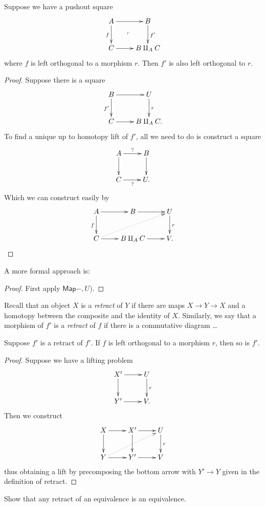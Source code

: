 \begin{lemma}
\label{lemma-orthogonal-lemma2}
Suppose we have a pushout square
$$
\xymatrix{
A\ar[r]\ar[d]_f\ar@{}[dr]|-{\ulcorner}&B\ar[d]^{f'}\\
C\ar[r]&B \amalg_A C
}
$$
where $f$ is left orthogonal to a morphism $r$.
Then $f'$ is also left orthogonal to $r$.
\end{lemma}

\begin{proof}
Suppose there is a square
$$
\xymatrix{
B\ar[r]\ar[d]_{f'}&U\ar[d]^{r}\\
C\ar[r]&B \amalg_A C.
}
$$
To find a unique up to homotopy lift of $f'$, 
all we need to do is construct a square
$$
\xymatrix{
A\ar[r]^?\ar[d]&B\ar[d]\\
C\ar[r]_?&U.
}
$$
Which we can construct easily by
$$
\xymatrix{
A \ar[d]_f\ar[r]& B\ar[r]& U\ar[d]^r\\
C\ar@{.>}[urr]\ar[r]&  B \amalg_A C \ar[r]&V.
}
$$
\end{proof}

A more formal approach is:

\begin{proof}
First apply $\mathsf{Map}-,U)$.
\end{proof}

\begin{definition}
\label{definition-retract}
Recall that an object $X$ is a {\it retract} of $Y$ 
if there are maps $X \to Y \to X$ and 
a homotopy between the composite and the identity of $X$.
Similarly,
we say that a morphism of $f'$ is
a {\it retract} of $f$ if there is a commutative diagram
…
\end{definition}

\begin{lemma}
\label{lemma-retract-orthogonality}
Suppose $f'$ is a retract of $f'$.
If $f$ is left orthogonal to a morphism
$r$, then so is $f'$.
\end{lemma}

\begin{proof}
Suppose we have a lifting problem
$$
\xymatrix{
X'\ar[r]\ar[d]&U\ar[d]^r\\
Y'\ar[r]&V.
}
$$
Then we construct
$$
\xymatrix{
X\ar[r]\ar[d]&X'\ar[r]\ar[d]&U\ar[d]^{r}\\
Y\ar[r]\ar@{.>}[urr]&Y'\ar[r]&V
}
$$
thus obtaining a lift by precomposing the 
bottom arrow with $Y' \to Y$
given in the definition of retract.
\end{proof}

\begin{exercise}
\label{exercise-retract-of-equivalence-is-equivalence}
Show that any retract of an equivalence is an equivalence.
\end{exercise}

